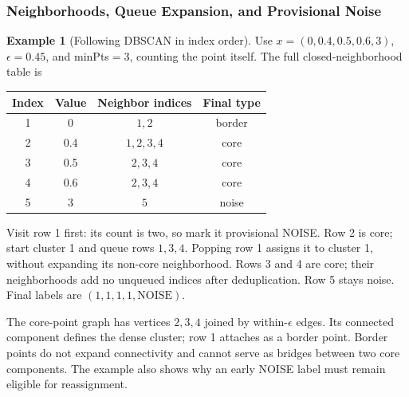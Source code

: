 \documentclass[11pt,twoside]{article}
\numberwithin{equation}{section}
\theoremstyle{plain}
\theoremstyle{definition}
\newtheorem{example}[theorem]{Example}
\theoremstyle{remark}
\begin{document}
\subsubsection{Neighborhoods, Queue Expansion, and Provisional Noise}
\begin{example}[Following DBSCAN in index order]
Use $x=(0,0.4,0.5,0.6,3)$, $\epsilon=0.45$, and minPts$=3$, counting the point itself. The full closed-neighborhood table is
\begin{center}
\begin{tabular}{c|c|c|c}
Index & Value & Neighbor indices & Final type\\\hline
1&0&$1,2$&border\\
2&0.4&$1,2,3,4$&core\\
3&0.5&$2,3,4$&core\\
4&0.6&$2,3,4$&core\\
5&3&$5$&noise
\end{tabular}
\end{center}
Visit row 1 first: its count is two, so mark it provisional NOISE. Row 2 is core; start cluster 1 and queue rows $1,3,4$. Popping row 1 assigns it to cluster 1, without expanding its non-core neighborhood. Rows 3 and 4 are core; their neighborhoods add no unqueued indices after deduplication. Row 5 stays noise. Final labels are $(1,1,1,1,\mathrm{NOISE})$.

The core-point graph has vertices $2,3,4$ joined by within-$\epsilon$ edges. Its connected component defines the dense cluster; row 1 attaches as a border point. Border points do not expand connectivity and cannot serve as bridges between two core components. The example also shows why an early NOISE label must remain eligible for reassignment.
\end{example}
\end{document}
